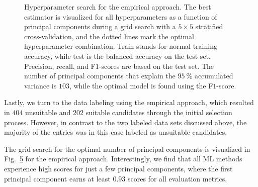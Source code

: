 \documentclass[superscriptaddress,unsortedaddress,
 amsmath,amssymb,
 aps,
]{revtex4-2}
\begin{document}
\begin{figure}[ht!]
  \begin{subfigure}[b]{1.0\textwidth}
    \centering
    
  \end{subfigure}
  \par\bigskip
  \begin{subfigure}[b]{0.5\textwidth}
    
    \caption{}
    \label{fig:q3-LOG}
  \end{subfigure}%
  \hfill
  \begin{subfigure}[b]{0.5\textwidth}
    
    \caption{}
    \label{fig:q3-DT}
  \end{subfigure}
  \begin{subfigure}[b]{0.5\textwidth}
    
    \caption{}
    \label{fig:q3-RF}
  \end{subfigure}%
  \hfill
  \begin{subfigure}[b]{0.5\textwidth}
    
    \caption{}
    \label{fig:q3-GB}
  \end{subfigure}

  \caption{{Hyperparameter search for the empirical approach. The best estimator is visualized for all hyperparameters as a function of principal components during a grid search with a $5\times5$ stratified cross-validation, and the dotted lines mark the optimal hyperparameter-combination. Train stands for normal training accuracy, while test is the balanced accuracy on the test set. Precision, recall, and F$1$-scores are based on the test set. The number of principal components that explain the $95 \ \%$ accumulated variance is $103$, while the optimal model is found using the F$1$-score.}}
  \label{fig:03-pca}
\end{figure}

Lastly, we turn to the data labeling using the empirical approach, which resulted in $404$ unsuitable and $202$ suitable candidates through the initial selection process. However, in contrast to the two labeled data sets discussed above, the majority of the entries was in this case labeled as unsuitable candidates. 

The grid search for the optimal number of principal components is visualized in Fig.~\ref{fig:03-pca} for the empirical approach. Interestingly, we find that all ML methods  experience high scores for just a few principal components, where the first principal component earns at least $0.93$ scores for all evaluation metrics. 
\end{document}
